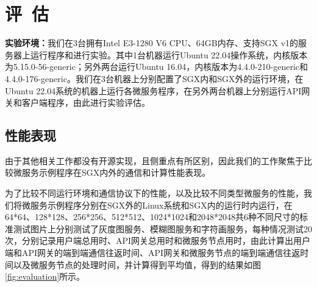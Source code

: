 \section{评\ 估}\label{sec:evaluation}

\textbf{实验环境：}我们在3台拥有Intel E3-1280 V6 CPU、64GB内存、支持SGX v1的服务器上运行程序和进行实验。其中1台机器运行Ubuntu 22.04操作系统，内核版本为5.15.0-56-generic；另外两台运行Ubuntu 16.04，内核版本为4.4.0-210-generic和4.4.0-176-generic。我们在3台机器上分别配置了SGX内和SGX外的运行环境，在Ubuntu 22.04系统的机器上运行各微服务程序，在另外两台机器上分别运行API网关和客户端程序，由此进行实验评估。

\subsection{性能表现}

由于其他相关工作都没有开源实现，且侧重点有所区别，因此我们的工作聚焦于比较微服务示例程序在SGX内外的通信和计算性能表现。

为了比较不同运行环境和通信协议下的性能，以及比较不同类型微服务的性能，我们将微服务示例程序分别在SGX外的Linux系统和SGX内的运行时内运行，在64*64、128*128、256*256、512*512、1024*1024和2048*2048共6种不同尺寸的标准测试图片上分别测试了灰度图服务、模糊图服务和字符画服务，每种情况测试20次，分别记录用户端总用时、API网关总用时和微服务节点用时，由此计算出用户端和API网关的端到端通信往返时间、API网关和微服务节点的端到端通信往返时间以及微服务节点的处理时间，并计算得到平均值，得到的结果如图\ref{fig:evaluation}所示。


